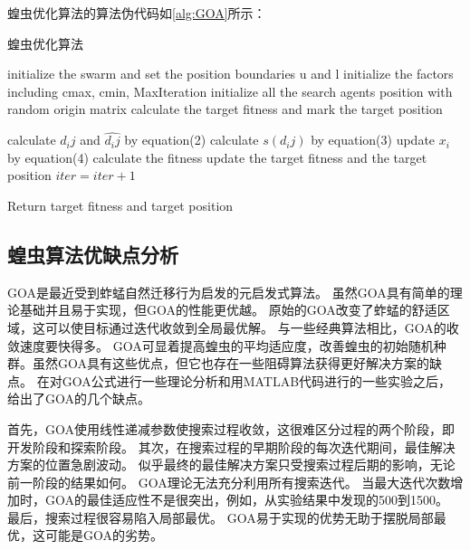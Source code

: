 蝗虫优化算法的算法伪代码如\ref{alg:GOA}所示：
\begin{algorithm}

    \caption{蝗虫优化算法}
    \label{alg:GOA}
    
    \begin{algorithmic}[1]
    \State initialize the swarm and set the position boundaries u and l
    \State initialize the factors including cmax, cmin, MaxIteration
    \State initialize all the search agents position with random origin matrix 
    \State calculate the target fitness and mark the target position
    
    \State calculate $d_ij$ and $\widehat{d_ij}$ by equation(2)
    \State calculate $s(d_ij)$ by equation(3)
    \State update $x_i$ by equation(4)
    \State calculate the fitness 
        \State update the target fitness and the target position
    \EndIf
    \State $iter = iter +1$
     
    \EndWhile

    \State Return target fitness and target position
    
    
    \end{algorithmic}
    
\end{algorithm}

\subsection{蝗虫算法优缺点分析}
GOA是最近受到蚱蜢自然迁移行为启发的元启发式算法。 虽然GOA具有简单的理论基础并且易于实现，但GOA的性能更优越。 原始的GOA改变了蚱蜢的舒适区域，这可以使目标通过迭代收敛到全局最优解。 与一些经典算法相比，GOA的收敛速度要快得多。 GOA可显着提高蝗虫的平均适应度，改善蝗虫的初始随机种群。虽然GOA具有这些优点，但它也存在一些阻碍算法获得更好解决方案的缺点。 在对GOA公式进行一些理论分析和用MATLAB代码进行的一些实验之后，给出了GOA的几个缺点。

首先，GOA使用线性递减参数使搜索过程收敛，这很难区分过程的两个阶段，即开发阶段和探索阶段。 其次，在搜索过程的早期阶段的每次迭代期间，最佳解决方案的位置急剧波动。 似乎最终的最佳解决方案只受搜索过程后期的影响，无论前一阶段的结果如何。 GOA理论无法充分利用所有搜索迭代。 当最大迭代次数增加时，GOA的最佳适应性不是很突出，例如，从实验结果中发现的500到1500。 最后，搜索过程很容易陷入局部最优。 GOA易于实现的优势无助于摆脱局部最优，这可能是GOA的劣势。



